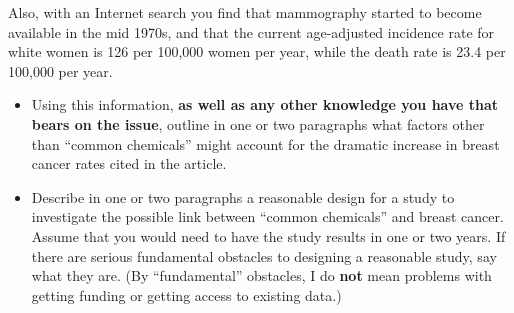 Also, with an Internet search you find that mammography started to become available in the mid 1970s, and that the current age-adjusted incidence  rate for white women is 126 per 100,000 women per year, while the death rate is 23.4 per 100,000 per year.

\begin{itemize}
\item Using this information, {\bf as well as any other knowledge you have that bears on the issue}, outline
in one or two paragraphs  what  factors other than ``common chemicals'' might account for the dramatic increase in breast cancer rates cited in the article.  

\TextEntry[itemname=dtk105-increase]

\item Describe in one or two paragraphs a reasonable design for a study to investigate the possible link between ``common chemicals'' and breast cancer.  Assume that you would need to have the study results in one or two years.  If there are serious fundamental obstacles to designing a reasonable study, say what they are.  (By ``fundamental'' obstacles, I do {\bf not} mean problems with getting funding or getting access to existing data.)

\TextEntry[itemname=dtk105-study]

\end{itemize}
